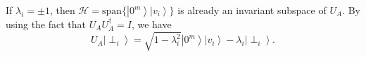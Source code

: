 \documentclass[11pt]{article}
\newcommand{\ket}[1]{\left|#1\right\rangle}
\begin{document}
If $\lambda_i = \pm 1$, then $\mathcal{H} = \text{span}\{\ket{0^m}\ket{v_i}\}$ is already an invariant subspace of $U_A$. By using the fact that $U_AU^{\dagger}_A = I$, we have 
\begin{equation}
    U_A\ket{\perp_i} = \sqrt{1 - \lambda_i^2}\ket{0^m}\ket{v_i} - \lambda_i\ket{\perp_i}.
\end{equation} 



\end{document}
